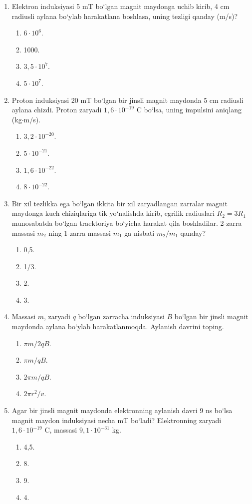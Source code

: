 \begin{enumerate}
\item Elektron induksiyasi 5 mT bo‘lgan magnit maydonga uchib kirib, 4 cm radiusli aylana bo‘ylab harakatlana boshlasa, uning tezligi qanday (m/s)?
\begin{enumerate}[label=\Alph*)]
\item $6 \cdot 10^6$.
\item 1000.
\item $3,5 \cdot 10^7$.
\item $5 \cdot 10^7$.
\end{enumerate}

\item Proton induksiyasi 20 mT bo‘lgan bir jinsli magnit maydonda 5 cm radiusli aylana chizdi. Proton zaryadi $1,6 \cdot 10^{-19}$ C bo‘lsa, uning impulsini aniqlang (kg$\cdot$m/s).
\begin{enumerate}[label=\Alph*)]
\item $3,2 \cdot 10^{-20}$.
\item $5 \cdot 10^{-21}$.
\item $1,6 \cdot 10^{-22}$.
\item $8 \cdot 10^{-22}$.
\end{enumerate}

\item Bir xil tezlikka ega bo‘lgan ikkita bir xil zaryadlangan zarralar magnit maydonga kuch chiziqlariga tik yo‘nalishda kirib, egrilik radiuslari $R_2 = 3R_1$ munosabatda bo‘lgan traektoriya bo‘yicha harakat qila boshladilar. 2-zarra massasi $m_2$ ning 1-zarra massasi $m_1$ ga nisbati $m_2/m_1$ qanday?
\begin{enumerate}[label=\Alph*)]
\item 0,5.
\item 1/3.
\item 2.
\item 3.
\end{enumerate}


\item Massasi $m$, zaryadi $q$ bo‘lgan zarracha induksiyasi $B$ bo‘lgan bir jinsli magnit maydonda aylana bo‘ylab harakatlanmoqda. Aylanish davrini toping.
\begin{enumerate}[label=\Alph*)]
\item $\pi m / 2qB$.
\item $\pi m / qB$.
\item $2\pi m / qB$.
\item $2\pi r^2 / v$.
\end{enumerate}

\item Agar bir jinsli magnit maydonda elektronning aylanish davri 9 ns bo‘lsa magnit maydon induksiyasi necha mT bo‘ladi? Elektronning zaryadi $1,6 \cdot 10^{-19}$ C, massasi $9,1 \cdot 10^{-31}$ kg.
\begin{enumerate}[label=\Alph*)]
\item 4,5.
\item 8.
\item 9.
\item 4.
\end{enumerate}


\end{enumerate}
